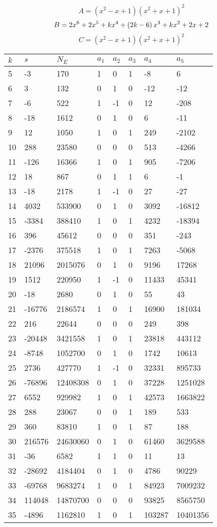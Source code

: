 \documentclass{amsart}
\begin{document}
$$A=(x^2
 - x
 + 1)(x^2
 + x
 + 1)^{2}$$
$$B=2\*x^6
 + 2\*x^5
 + k\*x^4
 + \left(2\*k
 - 6\right) \*x^3
 + k\*x^2
 + 2\*x
 + 2$$
$$C=(x^2
 - x
 + 1)(x^2
 + x
 + 1)^{2}$$
\begin{longtable}{|l|l|l|lllll|}
\hline
$k$ & $s$ & $N_E$ & $a_1$ & $a_2$ & $a_3$ & $a_4$ & $a_5$\\
\hline
5&-3&170&1&0&1&-8&6\\
6&3&132&0&1&0&-12&-12\\
7&-6&522&1&-1&0&12&-208\\
8&-18&1612&0&1&0&6&-11\\
9&12&1050&1&0&1&249&-2102\\
10&288&23580&0&0&0&513&-4266\\
11&-126&16366&1&0&1&905&-7206\\
12&18&867&0&1&1&6&-1\\
13&-18&2178&1&-1&0&27&-27\\
14&4032&533900&0&1&0&3092&-16812\\
15&-3384&388410&1&0&1&4232&-18394\\
16&396&45612&0&0&0&351&-243\\
17&-2376&375518&1&0&1&7263&-5068\\
18&21096&2015076&0&1&0&9196&17268\\
19&1512&220950&1&-1&0&11433&45341\\
20&-18&2680&0&1&0&55&43\\
21&-16776&2186574&1&0&1&16900&181034\\
22&216&22644&0&0&0&249&398\\
23&-20448&3421558&1&0&1&23818&443112\\
24&-8748&1052700&0&1&0&1742&10613\\
25&2736&427770&1&-1&0&32331&895733\\
26&-76896&12408308&0&1&0&37228&1251028\\
27&6552&929982&1&0&1&42573&1663822\\
28&288&23067&0&0&1&189&533\\
29&360&83810&1&0&1&87&188\\
30&216576&24630060&0&1&0&61460&3629588\\
31&-36&6582&1&1&0&11&13\\
32&-28692&4184404&0&1&0&4786&90229\\
33&-69768&9683274&1&0&1&84923&7009232\\
34&114048&14870700&0&0&0&93825&8565750\\
35&-4896&1162810&1&0&1&103287&10401356\\

\end{longtable}
\end{document}
